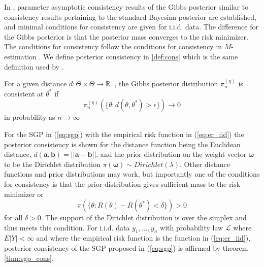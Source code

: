 In \cite{martin2022direct}, parameter asymptotic consistency results of the 
Gibbs posterior similar to consistency results pertaining to the standard 
Bayesian posterior are established, and minimal conditions for consistency 
are given for i.i.d. data. The difference for the Gibbs posterior is that 
the posterior mass converges to the risk minimizer. The conditions for 
consistency follow the conditions for consistency in $M$-estimation 
\cite[]{van1998asymptotic}. We define posterior consistency in 
\ref{def:cons} which is the same definition used by \cite{martin2022direct}.

\begin{definition}
\label{def:cons}
For a given distance $d:\Theta \times \Theta \rightarrow \mathbb{R}^+$, 
the Gibbs posterior distribution $\pi_n^{(\eta)}$ is consistent at 
$\theta^*$ if
\[
    \pi_n^{(\eta)}(\{\theta : d(\theta, \theta^*) > \epsilon\}) \rightarrow 0
\]
in probability as $n \rightarrow \infty$
\end{definition}


For the SGP in (\ref{eq:sgp}) with the empirical risk function in 
(\ref{eq:er_iid}) the posterior consistency is shown for the distance 
function being the Euclidean distance, 
$d(\boldsymbol{a}, \boldsymbol{b}) = ||\boldsymbol{a} - \boldsymbol{b}||$, 
and the prior distribution on the weight vector $\boldsymbol{\omega}$ 
to be the Dirichlet 
distribution $\pi(\boldsymbol{\omega}) \sim Dirichlet(\lambda)$. 
Other distance functions 
and prior distributions may work, but importantly one of the conditions for 
consistency is that the prior distribution gives sufficient mass to the risk 
minimizer or 
\begin{equation}
  \pi(\{\theta:R(\theta) - R(\theta^*) < \delta \}) > 0
\end{equation}
for all $\delta > 0$. The support of the Dirichlet distribution is over the 
simplex and thus meets this condition. For i.i.d. data $y_1, ..., y_n$ with 
probability law $\mathcal{L}$ where $E|Y| < \infty$ and where the empirical 
risk function is the function in (\ref{eq:er_iid}), posterior consistency of 
the SGP proposed in (\ref{eq:sgp}) is affirmed by theorem \ref{thm:sgp_cons}. 

\setcounter{theorem}{0}


